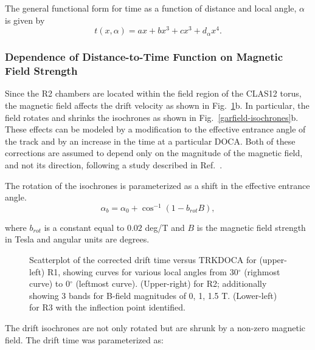 The general functional form for time as a function of distance and local angle, $\alpha$
is given by
\begin{equation}
\label{tfunctionofxandlocalangle}
t(x,\alpha) = a x + b x^3 + c x^3 + d_{\alpha} x^4.
\end{equation}

\subsubsection{Dependence of Distance-to-Time Function on Magnetic Field Strength}

Since the R2 chambers are located within the field region of the CLAS12 torus, the 
magnetic field affects the drift velocity as shown in 
Fig.~\ref{xvst}b.  In particular, the field rotates and shrinks the isochrones
as shown in Fig.~\ref{garfield-isochrones}b.  These effects can be modeled by a 
modification to the effective entrance angle of the track and by an increase 
in the time at a particular DOCA.  Both of these corrections are assumed to depend only on the 
magnitude of the magnetic field, and not its direction, following a study 
described in Ref.~\cite{MM-IEEE}.  

The rotation of the isochrones is parameterized as a shift in the effective
entrance angle.  
\begin{equation} 
\label{eq-bcorrn-to-ang}
\alpha_b = \alpha_0 + \cos^{-1}(1 - b_{rot} B), 
\end{equation}

where $b_{rot}$ is a constant equal to $0.02$ deg/T and $B$ is the magnetic field strength in Tesla and angular
units are degrees.

\begin{figure}[htb]
\vspace{10.0cm} 
\caption{\small{Scatterplot of the corrected drift time versus TRKDOCA for 
(upper-left) R1, showing curves for various local angles from 30$^{\circ}$
(righmost curve) to 0$^{\circ}$ (leftmost curve).  (Upper-right) for R2; 
additionally showing 3 bands for B-field magnitudes of 0, 1, 1.5 T.
(Lower-left) for R3 with the inflection point identified.}}
\label{xvst}
\end{figure}

The drift isochrones are not only rotated but are shrunk by a non-zero magnetic field.
The drift time was parameterized as:

